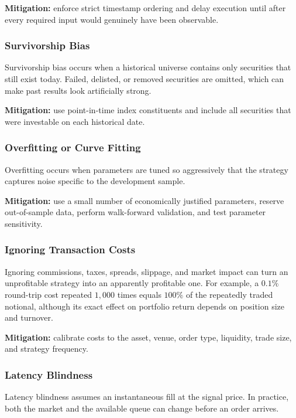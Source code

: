 \documentclass[12pt,openany]{book}
\theoremstyle{definition}
\theoremstyle{remark}
\begin{document}
\textbf{Mitigation:} enforce strict timestamp ordering and delay execution
until after every required input would genuinely have been observable.

\subsubsection{Survivorship Bias}

Survivorship bias occurs when a historical universe contains only securities
that still exist today. Failed, delisted, or removed securities are omitted,
which can make past results look artificially strong.

\textbf{Mitigation:} use point-in-time index constituents and include all
securities that were investable on each historical date.

\subsubsection{Overfitting or Curve Fitting}

Overfitting occurs when parameters are tuned so aggressively that the
strategy captures noise specific to the development sample.

\textbf{Mitigation:} use a small number of economically justified
parameters, reserve out-of-sample data, perform walk-forward validation, and
test parameter sensitivity.

\subsubsection{Ignoring Transaction Costs}

Ignoring commissions, taxes, spreads, slippage, and market impact can turn an
unprofitable strategy into an apparently profitable one. For example, a
\(0.1\%\) round-trip cost repeated \(1{,}000\) times equals \(100\%\) of the
repeatedly traded notional, although its exact effect on portfolio return
depends on position size and turnover.

\textbf{Mitigation:} calibrate costs to the asset, venue, order type,
liquidity, trade size, and strategy frequency.

\subsubsection{Latency Blindness}

Latency blindness assumes an instantaneous fill at the signal price. In
practice, both the market and the available queue can change before an order
arrives.
\end{document}
